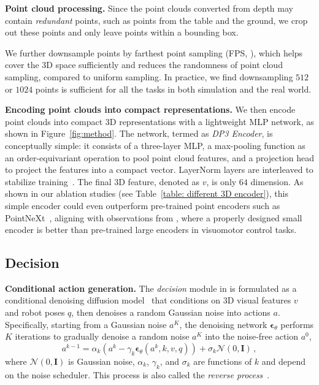 \textbf{Point cloud processing.} Since the point clouds converted from depth may contain \textit{redundant} points, such as points from the table and the ground, we crop out these points and only leave points within a bounding box. 

We further downsample points by farthest point sampling (FPS, \citep{qi2017pointnet}), which helps cover the 3D space sufficiently and reduces the randomness of point cloud sampling, compared to uniform sampling. In practice, we find downsampling $512$ or $1024$ points is sufficient for all the tasks in both simulation and the real world. 





\textbf{Encoding point clouds into compact representations.} We then encode point clouds into compact 3D representations with a lightweight MLP network, as shown in Figure~\ref{fig:method}. The network, termed as \textit{DP3 Encoder}, is conceptually simple: it consists of a three-layer MLP, a max-pooling function as an order-equivariant operation to pool point cloud features, and a projection head to project the features into a compact vector. LayerNorm layers are interleaved to stabilize training~\citep{hansen2023tdmpc2}. The final 3D feature, denoted as $v$, is only $64$ dimension. As shown in our ablation studies (see Table~\ref{table: different 3D encoder}), this simple encoder could even outperform pre-trained point encoders such as PointNeXt~\citep{qian2022pointnext}, aligning with observations from \citep{hansen2022lfs}, where a properly designed small encoder is better than pre-trained large encoders in visuomotor control tasks.




\subsection{Decision}

\textbf{Conditional action generation.} The \textit{decision} module in \ours is formulated as a conditional denoising diffusion model~\citep{ho2020ddpm,chi2023diffusion_policy,pearce2023imitating_diffusion} that conditions on 3D visual features $v$ and robot poses $q$, then denoises a random Gaussian noise into actions $a$. Specifically, starting from a Gaussian noise $a^K$, the denoising network $\boldsymbol{\epsilon}_\theta$ performs $K$ iterations to gradually denoise a random noise $a^K$ into the noise-free action $a^0$,
\begin{equation}
{a}^{k-1}=\alpha_k\left(a^k-\gamma_k \boldsymbol{\epsilon}_\theta\left(a^k, k, v, q\right)\right)+\sigma_k \mathcal{N}(0, \mathbf{I})\,,
\end{equation}
where $\mathcal{N}(0, \mathbf{I})$ is Gaussian noise, $\alpha_k$, $\gamma_k$, and $\sigma_k$ are functions of $k$ and depend on the noise scheduler. This process is also called the \textit{reverse process}~\citep{ho2020ddpm}.

